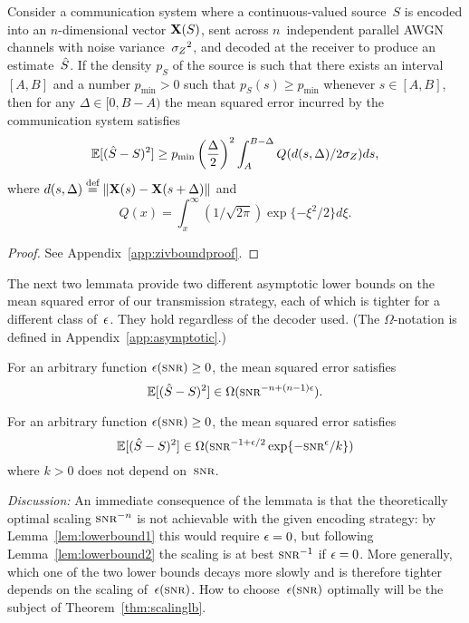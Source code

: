 \begin{lemma}
  \label{lem:zivbound}
  \label{LEM:ZIVBOUND}
  Consider a communication system where a con\-tin\-u\-ous-valued source~$S$ is
  encoded into an $n$-dimensional vector $\mathbf{X}(S)$, sent across $n$~independent
  parallel AWGN channels with noise variance~${{\sigma_Z}^2}$, and decoded at the receiver
  to produce an estimate~${\hat{S}}$.  If the density $p_S$ of the source is such that
  there exists an interval $[A,B]$ and a number $p_{\min} > 0$ such that $p_S(s)
  \ge p_{\min}$ whenever $s \in [A,B]$, then for any $\Delta \in [0,B-A)$ the
  mean squared error incurred by the communication system satisfies
  \begin{equation}
    \label{eq:zivbound}
    \mathbb{E}[({\hat{S}} - S)^2] \ge p_{\min} \left(\frac{\Delta}{2} \right)^2 
    \int_A^{B-\Delta} Q(d(s, \Delta) / 2 {\sigma_Z}) ds,
  \end{equation}
  where $d(s, \Delta) \stackrel{\text{def}}{=} \|\mathbf{X}(s) - \mathbf{X}(s+\Delta)\|$ and 
  \[Q(x) = \int_x^{\infty} (1/\sqrt{2\pi}) \exp\{-\xi^2/2\} d\xi.\]
\end{lemma}

\begin{proof}
  See Appendix~\ref{app:zivboundproof}.
\end{proof}

The next two lemmata provide two different asymptotic lower bounds on the
mean squared error of our transmission strategy, each of which is tighter for a
different class of~$\epsilon$. They hold regardless of the decoder used.  (The
$\Omega$-notation is defined in Appendix~\ref{app:asymptotic}.)

\begin{lemma}
  \label{lem:lowerbound1}
  For an arbitrary function $\e(\snr) \ge 0$, the mean squared error satisfies
  \begin{equation*}
    \mse \in \Omega(\snr^{-n + (n-1)\e}).
  \end{equation*}
\end{lemma}

\begin{lemma}
  \label{lem:lowerbound2}
  For an arbitrary function $\e(\snr) \ge 0$, the mean squared error satisfies
  \begin{equation*}
    \mse \in \Omega(\snr^{-1+\e/2} \exp\{-\snr^\e/k\})
  \end{equation*}
  where $k > 0$ does not depend on~$\snr$.
\end{lemma}

\emph{Discussion:} An immediate consequence of the lemmata is that the
theoretically optimal scaling $\snr^{-n}$ is not achievable with the given
encoding strategy: by Lemma~\ref{lem:lowerbound1} this would require $\epsilon = 0$,
but following Lemma~\ref{lem:lowerbound2} the scaling is at best $\snr^{-1}$ if
$\epsilon = 0 $.  More generally, which one of the two lower bounds decays more slowly
and is therefore tighter depends on the scaling of~$\e(\snr)$. How to
choose~$\e(\snr)$ optimally will be the subject of Theorem~\ref{thm:scalinglb}.

